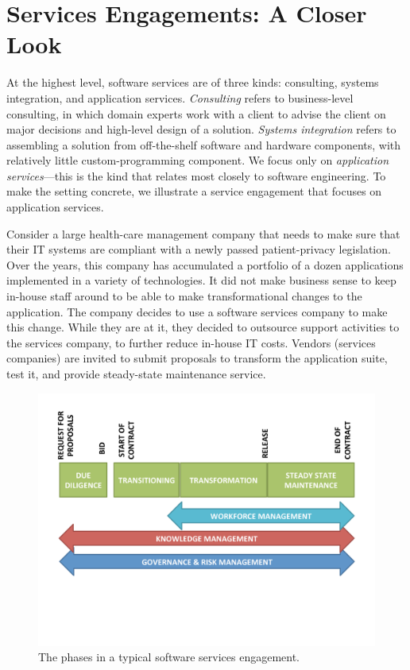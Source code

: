 \section{Services Engagements: A Closer Look}

At the highest level, software services are of three kinds: consulting, systems
integration, and application services. \textit{Consulting} refers to
business-level consulting, in which domain experts work with a client to advise
the client on major decisions and high-level design of a solution.
\textit{Systems integration} refers to assembling a solution from off-the-shelf
software and hardware components, with relatively little custom-programming
component.  We focus only on \textit{application services}---this is the kind
that relates most closely to software engineering.  To make the setting
concrete, we illustrate a service engagement that focuses on application
services.

Consider a large health-care management company that needs to make sure that
their IT systems are compliant with a newly passed patient-privacy
legislation. Over the years, this company has accumulated a portfolio of a dozen
applications implemented in a variety of technologies. It did not make business
sense to keep in-house staff around to be able to make transformational changes
to the application. The company decides to use a software services company to
make this change. While they are at it, they decided to outsource support
activities to the services company, to further reduce in-house IT costs.
Vendors (\ie services companies) are invited to submit proposals to transform
the application suite, test it, and provide steady-state maintenance service.

\begin{figure}[t]
\centering
\includegraphics[width=0.85\columnwidth, clip, trim = 0mm 50mm 0mm
  10mm]{figs/phases.pdf}
\vspace*{-10pt}
\caption{The phases in a typical software services engagement.}
\vspace*{-15pt}
\label{fig:phases}
\end{figure}

